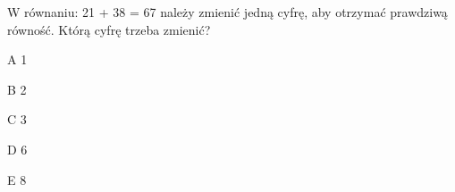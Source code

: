 \begin{tresc}
W równaniu: 21 + 38 = 67 należy zmienić jedną cyfrę, aby otrzymać prawdziwą równość. Którą cyfrę trzeba zmienić?
\end{tresc}
\begin{wariant}{A} 1 \end{wariant}
\begin{wariant}{B} 2 \end{wariant}
\begin{wariant}{C} 3 \end{wariant}
\begin{wariant}{D} 6 \end{wariant}
\begin{wariant}{E} 8 \end{wariant}
